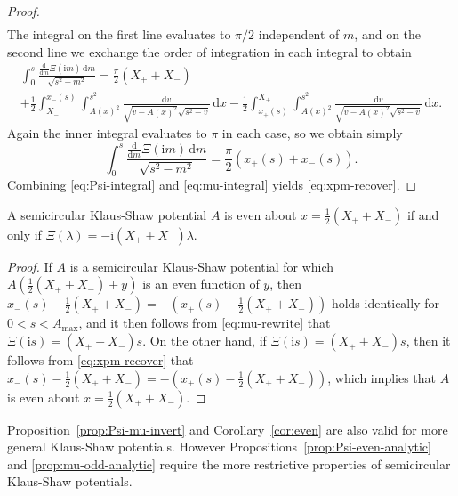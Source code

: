 \documentclass[12pt]{amsart}
\numberwithin{equation}{section}
\newcommand{\dd}{\mathrm{d}}
\newcommand{\ii}{\mathrm{i}}
\newcommand{\tailint}{\Xi}
\begin{document}
\begin{proof}
\begin{multline}
\end{multline}
The integral on the first line evaluates to $\pi/2$ independent of $m$, and on the second line we exchange the order of integration in each integral to obtain
\begin{multline}
\int_0^s\frac{\displaystyle\frac{\dd}{\dd m}\tailint(\ii m)\,\dd m}{\sqrt{s^2-m^2}} =\frac{\pi}{2}(X_++X_-)\\ +
\frac{1}{2}\int_{X_-}^{x_-(s)}\int_{A(x)^2}^{s^2}\frac{\dd v}{\sqrt{v-A(x)^2}\sqrt{s^2-v}}\,\dd x -\frac{1}{2}\int_{x_+(s)}^{X_+}\int_{A(x)^2}^{s^2}\frac{\dd v}{\sqrt{v-A(x)^2}\sqrt{s^2-v}}\,\dd x.
\end{multline}
Again the inner integral evaluates to $\pi$ in each case, so we obtain simply
\begin{equation}
\int_0^s\frac{\displaystyle\frac{\dd}{\dd m}\tailint(\ii m)\,\dd m}{\sqrt{s^2-m^2}} =\frac{\pi}{2}(x_+(s)+x_-(s)).
\label{eq:mu-integral}
\end{equation}
Combining \eqref{eq:Psi-integral} and \eqref{eq:mu-integral} yields \eqref{eq:xpm-recover}.
\end{proof}

\begin{cor}
A semicircular Klaus-Shaw potential $A$ is even about $x=\frac{1}{2}(X_++X_-)$ if and only if $\tailint(\lambda)=-\ii (X_++X_-)\lambda$.  
\label{cor:even}
\end{cor}
\begin{proof}
If $A$ is a semicircular Klaus-Shaw potential for which $A(\frac{1}{2}(X_++X_-)+y)$ is an even function of $y$, then $x_-(s)-\frac{1}{2}(X_++X_-)=-(x_+(s)-\frac{1}{2}(X_++X_-))$ holds identically for $0<s<A_\mathrm{max}$, and it then follows from \eqref{eq:mu-rewrite} that $\tailint(\ii s)=(X_++X_-)s$.  On the other hand, if $\tailint(\ii s)=(X_++X_-)s$, then it follows from \eqref{eq:xpm-recover} that $x_-(s)-\frac{1}{2}(X_++X_-)=-(x_+(s)-\frac{1}{2}(X_++X_-))$, which implies that $A$ is even about $x=\frac{1}{2}(X_++X_-)$.
\end{proof}

\begin{rem}
Proposition~\ref{prop:Psi-mu-invert} and Corollary~\ref{cor:even} are also valid for more general Klaus-Shaw potentials.  However Propositions~\ref{prop:Psi-even-analytic} and \ref{prop:mu-odd-analytic} require the more restrictive properties of semicircular Klaus-Shaw potentials.
\label{rem:general-KS}
\end{rem}
\end{document}
